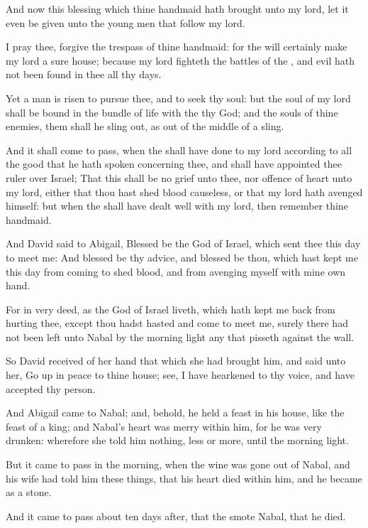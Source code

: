 \verse And now this blessing which thine handmaid hath brought unto my lord, let it even be given unto the young men that follow my lord.

\verse I pray thee, forgive the trespass of thine handmaid: for the \LORD will certainly make my lord a sure house; because my lord fighteth the battles of the \LORD, and evil hath not been found in thee all thy days.

\verse Yet a man is risen to pursue thee, and to seek thy soul: but the soul of my lord shall be bound in the bundle of life with the \LORD thy God; and the souls of thine enemies, them shall he sling out, as out of the middle of a sling.

\verse And it shall come to pass, when the \LORD shall have done to my lord according to all the good that he hath spoken concerning thee, and shall have appointed thee ruler over Israel; \verse That this shall be no grief unto thee, nor offence of heart unto my lord, either that thou hast shed blood causeless, or that my lord hath avenged himself: but when the \LORD shall have dealt well with my lord, then remember thine handmaid.

\verse And David said to Abigail, Blessed be the \LORD God of Israel, which sent thee this day to meet me: \verse And blessed be thy advice, and blessed be thou, which hast kept me this day from coming to shed blood, and from avenging myself with mine own hand.

\verse For in very deed, as the \LORD God of Israel liveth, which hath kept me back from hurting thee, except thou hadst hasted and come to meet me, surely there had not been left unto Nabal by the morning light any that pisseth against the wall.

\verse So David received of her hand that which she had brought him, and said unto her, Go up in peace to thine house; see, I have hearkened to thy voice, and have accepted thy person.

\verse And Abigail came to Nabal; and, behold, he held a feast in his house, like the feast of a king; and Nabal's heart was merry within him, for he was very drunken: wherefore she told him nothing, less or more, until the morning light.

\verse But it came to pass in the morning, when the wine was gone out of Nabal, and his wife had told him these things, that his heart died within him, and he became as a stone.

\verse And it came to pass about ten days after, that the \LORD smote Nabal, that he died.

